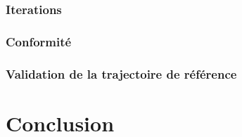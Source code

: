 \documentclass{udes_rapport} %
\begin{document}
\subsubsection{Iterations}

\subsubsection{Conformité}
\subsubsection{Validation de la trajectoire de référence}
\section{Conclusion}






\begin{comment}
\begin{center}
	\centering
	\texttt{[image: puissance]}
	\captionof{figure}{Spectre de puissance d'une onde de 1kHz}
	\label{puissance}
\end{center}


\section{Filtres FIR}
\noindent\begin{minipage}{\textwidth} 
\begin{minipage}{0.5\textwidth}
  \centering
  \texttt{[image: ampFIR]}
  \captionof{subfigure}{Amplitude}
  \label{FIR:ampFIR}
\end{minipage}%
\begin{minipage}{0.5\textwidth}
  \centering 
  \texttt{[image: phaseCute]} 
  \captionof{subfigure}{Phase} 
  \label{FIR:phaseFIR} 
\end{minipage} 
\captionof{figure}{Filtre IIR} 
\label{FIR} 
\end{minipage}
\end{comment}
\end{document}
